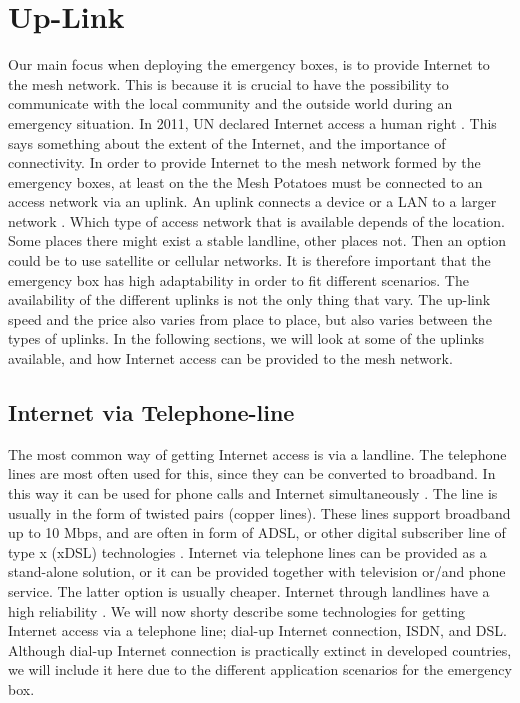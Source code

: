 \section{Up-Link}
Our main focus when deploying the emergency boxes, is to provide Internet to the mesh network. This is because it is crucial to have the possibility to communicate with the local community and the outside world during an emergency situation. In 2011, UN declared Internet access a human right \cite{HR}. This says something about the extent of the Internet, and the importance of connectivity. In order to provide Internet to the mesh network formed by the emergency boxes, at least on the the Mesh Potatoes must be connected to an access network via an uplink. An uplink connects a device or a LAN to a larger network \cite{uplink}. Which type of access network that is available depends of the location. Some places there might exist a stable landline, other places not. Then an option could be to use satellite or cellular networks. It is therefore important that the emergency box has high adaptability in order to fit different scenarios. The availability of the different uplinks is not the only thing that vary. The up-link speed and the price also varies from place to place, but also varies between the types of uplinks. In the following sections, we will look at some of the uplinks available, and how Internet access can be provided to the mesh network.  

\subsection{Internet via Telephone-line}
The most common way of getting Internet access is via a landline. The telephone lines are most often used for this, since they can be converted to broadband. In this way it can be used for phone calls and Internet simultaneously \cite{internet}. The line is usually in the form of twisted pairs (copper lines). These lines support broadband up to 10 Mbps, and are often in form of ADSL, or other digital subscriber line of type x (xDSL) technologies \citep{audestad}. Internet via telephone lines can be provided as a stand-alone solution, or it can be provided together with television or/and phone service. The latter option is usually cheaper. Internet through landlines have a high reliability \cite{cablevssatellite}. We will now shorty describe some technologies for getting Internet access via a telephone line; dial-up Internet connection, ISDN, and DSL. Although dial-up Internet connection is practically extinct in developed countries, we will include it here due to the different application scenarios for the emergency box. 


